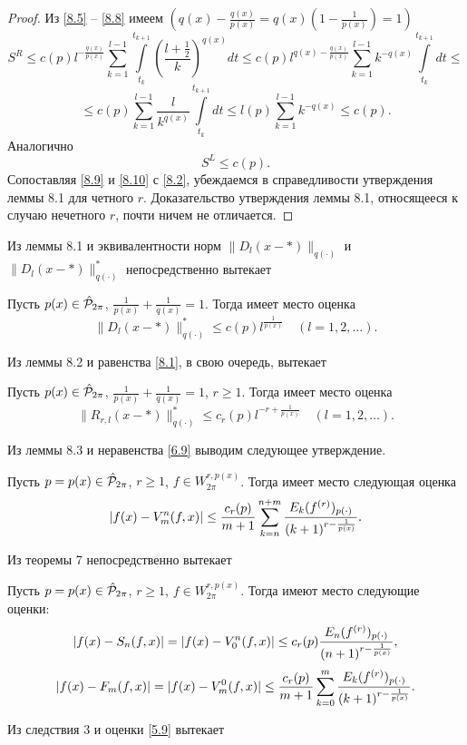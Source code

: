 \begin{proof}
Из \eqref{8.5} -- \eqref{8.8} имеем
$(q(x)-\frac{q(x)}{p(x)}=q(x)(1-\frac{1}{p(x)})=1)$
$$
    S^{R}\leq c(p)l^{-\frac{q(x)}{p(x)}}
    \sum\limits_{k=1}^{l-1}\int\limits_{t_{k}}^{t_{k+1}}\left(\frac{l+\frac12}{k}\right)^{q(x)}dt
    \leq c(p)l^{q(x)-\frac{q(x)}{p(x)}}\sum\limits_{k=1}^{l-1}k^{-q(x)}\int\limits_{t_{k}}^{t_{k+1}}dt\leq
$$
\begin{equation}\label{8.9}
    \leq c(p)\sum\limits_{k=1}^{l-1}\frac{l}{k^{q(x)}}\int\limits_{t_{k}}^{t_{k+1}}dt\leq l(p)
    \sum\limits_{k=1}^{l-1}k^{-q(x)}\leq c(p).
\end{equation}
Аналогично
\begin{equation}\label{8.10}
    S^{L}\leq c(p).
\end{equation}
Сопоставляя \eqref{8.9}  и \eqref{8.10} с \eqref{8.2}, убеждаемся в
справедливости утверждения леммы 8.1 для четного $r$. Доказательство утверждения леммы 8.1, относящееся к случаю  нечетного $r$, почти ничем не отличается.
\end{proof}
Из леммы 8.1 и эквивалентности норм $\|D_{l}(x-*)\|_{q(\cdot)}$ и $\|D_{l}(x-*)\|^*_{q(\cdot)}$ непосредственно вытекает
\begin{lemma}\label{8.2}
 Пусть  $p(x)\in \hat {\cal P}_{2\pi}$,
$\frac{1}{p(x)}+\frac{1}{q(x)}=1$. Тогда имеет место оценка
$$
    \|D_{l}(x-*)\|^*_{q(\cdot)}\le c(p)l^{\frac{1}{p(x)}}\quad(l=1,2,\ldots).
$$
\end{lemma}
Из леммы 8.2 и равенства \eqref{8.1}, в свою очередь, вытекает
\begin{lemma}\label{8.3}
 Пусть  $p(x)\in \hat {\cal P}_{2\pi}$,
$\frac{1}{p(x)}+\frac{1}{q(x)}=1$, $r\ge1$. Тогда имеет место оценка
$$
    \|R_{r,l}(x-*)\|^*_{q(\cdot)}\le c_r(p)l^{-r+{\frac{1}{p(x)}}}\quad(l=1,2,\ldots).
$$
\end{lemma}
Из леммы 8.3 и неравенства \eqref{6.9} выводим следующее утверждение.

\begin{theorem}\label{t7}
Пусть  $p=p(x)\in \hat{\cal  P}_{2\pi}$, $r\ge1$, $f\in W^{r,p(x)}_{2\pi}$. Тогда имеет место следующая оценка
$$
     |f(x)-V_m^n(f,x)|\le \frac{c_r(p)}{m+1}\sum_{k=n}^{n+m}{E_k(f^{(r)})_{p(\cdot)}\over (k+1)^{r-{\frac{1}{p(x)}}}}.
$$
 \end{theorem}

Из теоремы 7 непосредственно вытекает


\begin{corollary}\label{3}
Пусть  $p=p(x)\in \hat{\cal  P}_{2\pi}$, $r\ge1$, $f\in W^{r,p(x)}_{2\pi}$. Тогда имеют место следующие оценки:
$$
|f(x)-S_n(f,x)|= |f(x)-V_0^n(f,x)|\le c_r(p){E_n(f^{(r)})_{p(\cdot)}\over (n+1)^{r-{\frac{1}{p(x)}}}},
$$
$$
 |f(x)-F_m(f,x)| =   |f(x)-V_m^0(f,x)|\le \frac{c_r(p)}{m+1}\sum_{k=0}^{m}{E_k(f^{(r)})_{p(\cdot)}\over (k+1)^{r-{\frac{1}{p(x)}}}} .
$$
 \end{corollary}
 Из следствия 3 и оценки \eqref{5.9} вытекает

